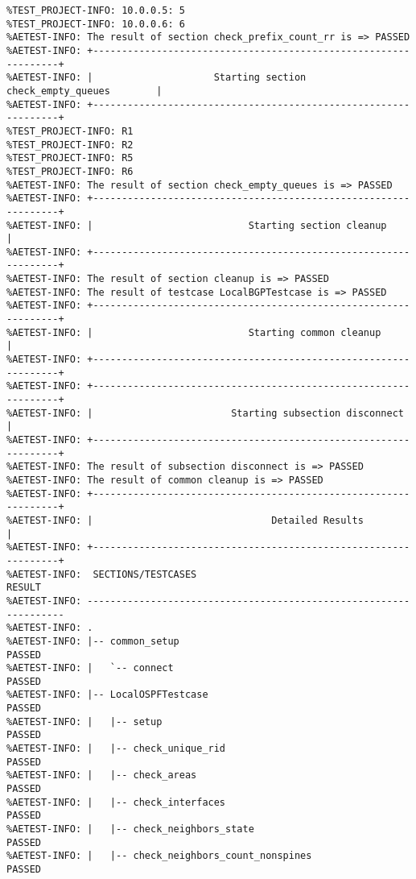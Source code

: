 \begin{verbatim}
%TEST_PROJECT-INFO: 10.0.0.5: 5
%TEST_PROJECT-INFO: 10.0.0.6: 6
%AETEST-INFO: The result of section check_prefix_count_rr is => PASSED
%AETEST-INFO: +----------------------------------------------------------------+
%AETEST-INFO: |                     Starting section check_empty_queues        |
%AETEST-INFO: +----------------------------------------------------------------+
%TEST_PROJECT-INFO: R1
%TEST_PROJECT-INFO: R2
%TEST_PROJECT-INFO: R5
%TEST_PROJECT-INFO: R6
%AETEST-INFO: The result of section check_empty_queues is => PASSED
%AETEST-INFO: +----------------------------------------------------------------+
%AETEST-INFO: |                           Starting section cleanup             |
%AETEST-INFO: +----------------------------------------------------------------+
%AETEST-INFO: The result of section cleanup is => PASSED
%AETEST-INFO: The result of testcase LocalBGPTestcase is => PASSED
%AETEST-INFO: +----------------------------------------------------------------+
%AETEST-INFO: |                           Starting common cleanup              |
%AETEST-INFO: +----------------------------------------------------------------+
%AETEST-INFO: +----------------------------------------------------------------+
%AETEST-INFO: |                        Starting subsection disconnect          |
%AETEST-INFO: +----------------------------------------------------------------+
%AETEST-INFO: The result of subsection disconnect is => PASSED
%AETEST-INFO: The result of common cleanup is => PASSED
%AETEST-INFO: +----------------------------------------------------------------+
%AETEST-INFO: |                               Detailed Results                 |
%AETEST-INFO: +----------------------------------------------------------------+
%AETEST-INFO:  SECTIONS/TESTCASES                                        RESULT
%AETEST-INFO: ------------------------------------------------------------------
%AETEST-INFO: .
%AETEST-INFO: |-- common_setup                                            PASSED
%AETEST-INFO: |   `-- connect                                             PASSED
%AETEST-INFO: |-- LocalOSPFTestcase                                       PASSED
%AETEST-INFO: |   |-- setup                                               PASSED
%AETEST-INFO: |   |-- check_unique_rid                                    PASSED
%AETEST-INFO: |   |-- check_areas                                         PASSED
%AETEST-INFO: |   |-- check_interfaces                                    PASSED
%AETEST-INFO: |   |-- check_neighbors_state                               PASSED
%AETEST-INFO: |   |-- check_neighbors_count_nonspines                     PASSED

\end{verbatim}
